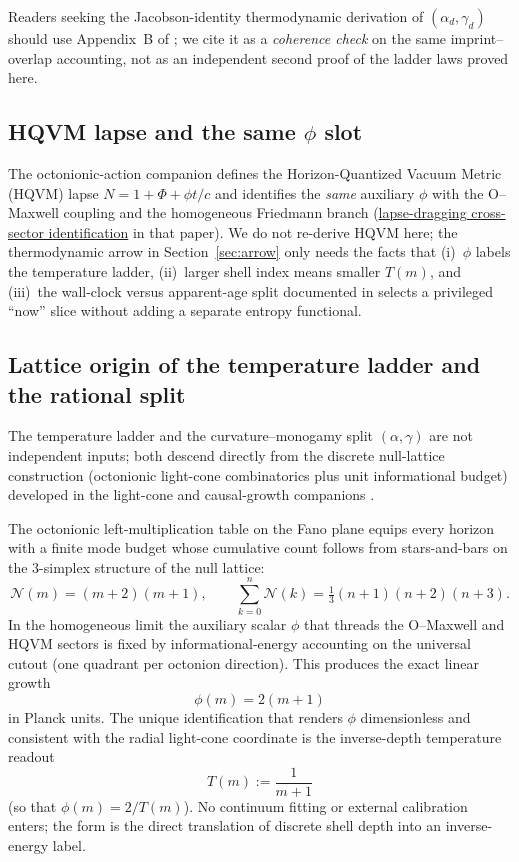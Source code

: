 \documentclass[11pt]{amsart}
\begin{document}
Readers seeking the Jacobson-identity thermodynamic derivation of
$(\alpha_d,\gamma_d)$ should use Appendix~B of \cite{hqiv-3d-growth-paper}; we cite it
as a \emph{coherence check} on the same imprint--overlap accounting, not as an
independent second proof of the ladder laws proved here.

\subsection{HQVM lapse and the same $\phi$ slot}
\label{subsec:hqvm}

The octonionic-action companion \cite{hqiv-oct-action-paper} defines the
Horizon-Quantized Vacuum Metric (HQVM) lapse
$N=1+\Phi+\phi t/c$ and identifies the \emph{same} auxiliary $\phi$ with the
O--Maxwell coupling and the homogeneous Friedmann branch
(\hyperref[lean:lapse-bridge]{lapse-dragging cross-sector identification} in that paper).
We do not re-derive HQVM here; the thermodynamic arrow in
Section~\ref{sec:arrow} only needs the facts that (i)~$\phi$ labels the temperature
ladder, (ii)~larger shell index means smaller $T(m)$, and (iii)~the wall-clock versus
apparent-age split documented in \cite{hqiv-kirchhoff-paper} selects a privileged
``now'' slice without adding a separate entropy functional.

\subsection{Lattice origin of the temperature ladder and the rational split}
\label{subsec:lattice-origin}

The temperature ladder and the curvature--monogamy split $(\alpha,\gamma)$ are not
independent inputs; both descend directly from the discrete null-lattice
construction (octonionic light-cone combinatorics plus unit informational budget)
developed in the light-cone and causal-growth companions \cite{hqiv-lightcone-paper,hqiv-3d-growth-paper}.

The octonionic left-multiplication table on the Fano plane equips every horizon with
a finite mode budget whose cumulative count follows from stars-and-bars on the
3-simplex structure of the null lattice:
\[
  \mathcal{N}(m) = (m+2)(m+1),\qquad
  \sum_{k=0}^{n} \mathcal{N}(k) = \tfrac13(n+1)(n+2)(n+3).
\]
In the homogeneous limit the auxiliary scalar $\phi$ that threads the O--Maxwell and
HQVM sectors is fixed by informational-energy accounting on the universal cutout
(one quadrant per octonion direction). This produces the exact linear growth
\[
  \phi(m) = 2(m+1)
\]
in Planck units. The unique identification that renders $\phi$ dimensionless and
consistent with the radial light-cone coordinate is the inverse-depth temperature
readout
\[
  T(m) := \frac{1}{m+1}
\]
(so that $\phi(m) = 2/T(m)$). No continuum fitting or external calibration enters;
the form is the direct translation of discrete shell depth into an inverse-energy
label.
\end{document}
